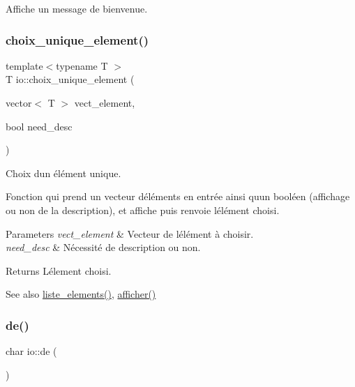 Affiche un message de bienvenue. \mbox{\label{namespaceio_ad0d98891e6dc1050ef87a4a573ba13b0}} 
\subsubsection{\texorpdfstring{choix\+\_\+unique\+\_\+element()}{choix\_unique\_element()}}
{\footnotesize\ttfamily template$<$typename T $>$ \\
T io\+::choix\+\_\+unique\+\_\+element (\begin{DoxyParamCaption}\item[{vector$<$ T $>$}]{vect\+\_\+element,  }\item[{bool}]{need\+\_\+desc }\end{DoxyParamCaption})}



Choix d\textquotesingle{}un élément unique. 

Fonction qui prend un vecteur d\textquotesingle{}éléments en entrée ainsi qu\textquotesingle{}un booléen (affichage ou non de la description), et affiche puis renvoie l\textquotesingle{}élément choisi. 
\begin{DoxyParams}{Parameters}
{\em vect\+\_\+element} & Vecteur de l\textquotesingle{}élément à choisir. \\
\hline
{\em need\+\_\+desc} & Nécessité de description ou non. \\
\hline
\end{DoxyParams}
\begin{DoxyReturn}{Returns}
L\textquotesingle{}élement choisi. 
\end{DoxyReturn}
\begin{DoxySeeAlso}{See also}
\hyperlink{namespaceio_a22b137cb32b93d8cfa7cceddf7a7e118}{liste\+\_\+elements()}, \hyperlink{namespaceio_a0e3593d732c42572e8b3cb09ad21c4c9}{afficher()} 
\end{DoxySeeAlso}
\mbox{\label{namespaceio_ae9908b55f26f07e78043d7cfad003d22}} 
\subsubsection{\texorpdfstring{de()}{de()}}
{\footnotesize\ttfamily char io\+::de (\begin{DoxyParamCaption}{ }\end{DoxyParamCaption})}



